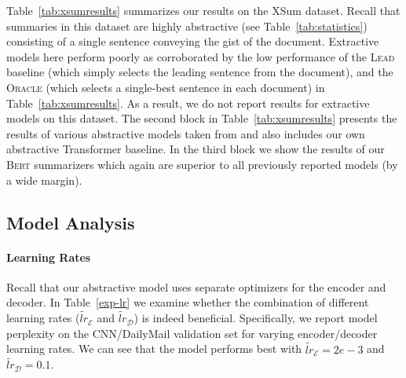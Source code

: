 \documentclass[11pt,a4paper]{article}
\makeatletter
\newcommand{\thickhline}{%
    \noalign {\ifnum 0=`}\fi \hrule height 1pt
    \futurelet \reserved@a \@xhline
}
\makeatother
\begin{document}
    
    Table~\ref{tab:xsumresults} summarizes our results on the XSum
    dataset. Recall that summaries in this dataset are highly
    abstractive (see Table~\ref{tab:statistics}) consisting of a
    single sentence conveying the gist of the document. Extractive
    models here perform poorly as corroborated by the low performance
    of the \textsc{Lead} baseline (which simply selects the leading
    sentence from the document), and the \textsc{Oracle} (which
    selects a single-best sentence in each document) in
    Table~\ref{tab:xsumresults}. As a result, we do not report results
    for extractive models on this dataset.
    The second block in Table~\ref{tab:xsumresults} presents the results
    of various abstractive models taken from \citet{xsum} and also
    includes our own abstractive Transformer baseline. In the third block
    we show the results of our \textsc{Bert} summarizers which again are
    superior to all previously reported models (by a wide margin).
    
    \begin{table}[t]
        \caption{\label{exp-lr} Model perplexity  (CNN/DailyMail; validation set)
            under different combinations of encoder  and decoder
            learning rates.}
    \end{table}
    
    
    \subsection{Model Analysis}
    
    \paragraph{Learning Rates} Recall that our abstractive model uses
    separate optimizers for the encoder and decoder. In Table~\ref{exp-lr}
    we examine whether the combination of different learning rates
    ($\tilde{lr}_{\mathcal{E}}$ and $\tilde{lr}_{\mathcal{D}}$) is indeed
    beneficial.  Specifically, we report model perplexity on the
    CNN/DailyMail validation set for varying encoder/decoder learning
    rates.  We can see that the model performs best with
    $\tilde{lr}_{\mathcal{E}}=2e-3$ and $\tilde{lr}_{\mathcal{D}}=0.1$.
    
\end{document}
